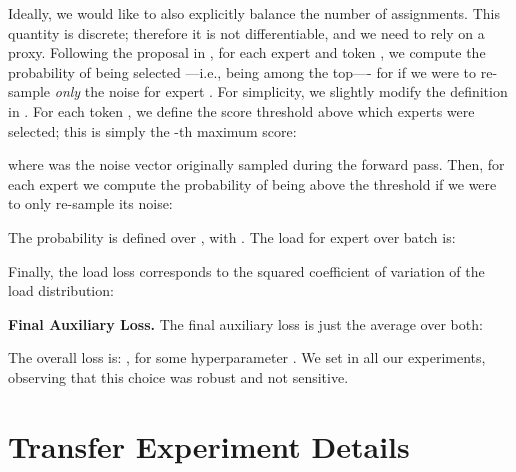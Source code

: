 \documentclass{article}
\begin{document}
Ideally, we would like to also explicitly balance the number of assignments.
This quantity is discrete; therefore it is not differentiable, and we need to rely on a proxy.
Following the proposal in \cite{shazeer2017outrageously}, for each expert  and token , we compute the probability of  being selected ---i.e., being among the top---- for  if we were to re-sample \emph{only} the noise for expert .
For simplicity, we slightly modify the definition in \cite{shazeer2017outrageously}.
For each token , we define the score threshold above which experts were selected; this is simply the -th maximum score:

where  was the noise vector originally sampled during the forward pass.
Then, for each expert  we compute the probability of  being above the threshold if we were to only re-sample its noise:

The probability is defined over , with .
The load for expert  over batch  is:

Finally, the load loss corresponds to the squared coefficient of variation of the load distribution:


\textbf{Final Auxiliary Loss.}
The final auxiliary loss is just the average over both:

The overall loss is: , for some hyperparameter .
We set  in all our experiments, observing that this choice was robust and not sensitive.
 \clearpage
\section{Transfer Experiment Details}
\label{sec:experiment_details}
\end{document}
